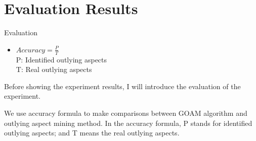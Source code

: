 \documentclass[
 size=14pt,
 paper=smartboard,  %
 mode=present, 		%
 display=slides, 	%
 style=tuliplab,  	%
 pauseslide,
 fleqn,leqno]{powerdot}
\begin{document}
\section{Evaluation Results}


\begin{slide}[toc=,bm=]{Evaluation}

\begin{center}
\begin{itemize}

\item
\smallskip
\large
{$Accuracy = \frac{P}{T}$ \\
P: Identified outlying aspects \\

T: Real outlying aspects}

\end{itemize}
\end{center}

\begin{note}
Before showing the experiment results,
I will introduce the evaluation of the experiment.

We use accuracy formula to make comparisons between GOAM algorithm
and outlying aspect mining method.
In the accuracy formula,
P stands for identified outlying aspects;
and T means the real outlying aspects.
\end{note}

\end{slide}
\end{document}
